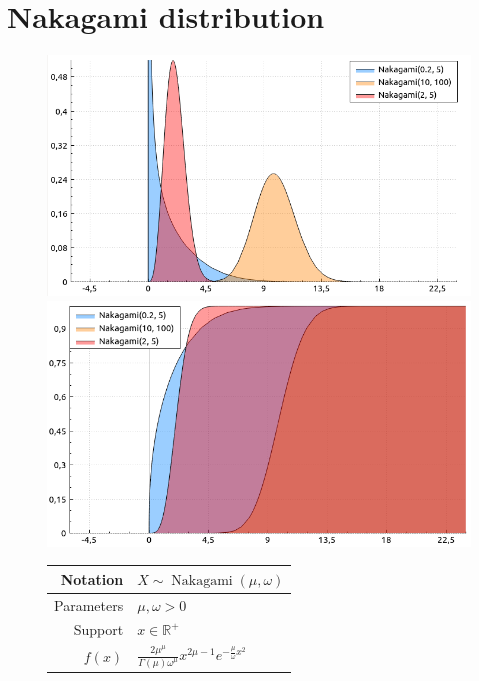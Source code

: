 \documentclass[a4paper,11pt]{article}
\theoremstyle{plain}
\theoremstyle{definition}
\newcommand{\MR}{\mathbb{R}}
\begin{document}
	\section{Nakagami distribution}
	\begin{figure}[!htb]\centering
		\begin{minipage}{0.55\textwidth}
			\includegraphics[width=\linewidth, right]{nakagami_pdf}
			\captionsetup{labelformat=empty}
			\includegraphics[width=\linewidth, right]{nakagami_cdf}
			\captionsetup{labelformat=empty}
		\end{minipage}
		\begin{minipage}{0.4\textwidth}
			\begin{tabular}{| r | l |}
				\hline
				Notation & $X \sim \operatorname{Nakagami}(\mu, \omega)$ \\
				\hline
				Parameters & $\mu, \omega > 0$ \\
				\hline
				Support & $x \in \MR^+$  \\
				\hline
				$f(x)$ & $ \frac{2\mu^\mu}{\Gamma(\mu) \omega^\mu} x^{2\mu - 1} e^{-\frac{\mu}{\omega}x^2}   $ \\

\end{tabular}
\end{minipage}
\end{figure}
\end{document}
